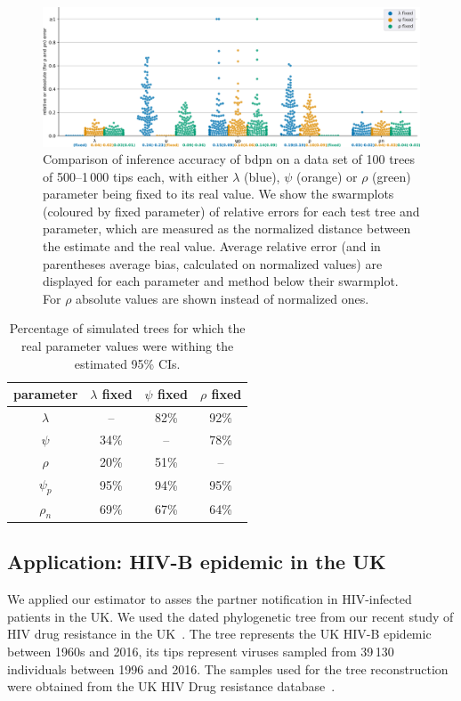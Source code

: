 \documentclass[a4paper,10pt]{article}
\begin{document}
\begin{figure}[!pht]
\centering 
\includegraphics[width=1\textwidth]{Fig_errors.eps}
\caption{Comparison of inference accuracy of bdpn on a data set of 100 trees of 500--1\,000 tips each, with either $\lambda$ (blue), $\psi$ (orange) or $\rho$ (green) parameter being fixed to its real value.
We show the swarmplots (coloured by fixed parameter) of relative errors for each test tree and parameter, which are measured as the normalized distance between the estimate and the real value. Average relative error (and in parentheses average bias, calculated on normalized values) are displayed for each parameter and method below their swarmplot. For $\rho$ absolute values are shown instead of normalized ones. } 
\label{fig:sim} 
\end{figure}
 
 \begin{table}[!h]\centering
\small
\caption{Percentage of simulated trees for which the real parameter values were withing the estimated 95\% CIs. \smallskip}
\begin{tabular}{c|ccc}
\textbf{parameter} & \textbf{$\lambda$ fixed} & \textbf{$\psi$ fixed} & \textbf{$\rho$ fixed} \\
\toprule 
 $\lambda$ & -- &  82\% & 92\% \\
 $\psi$ & 34\% & -- & 78\% \\
 $\rho$ & 20\% & 51\%  & -- \\
 $\psi_p$ & 95\% & 94\% & 95\% \\
 $\rho_n$ & 69\% & 67\% & 64\% \\
\bottomrule
\end{tabular}
\label{tbl:ci}
\end{table}


\subsection{Application: HIV-B epidemic in the UK}
We applied our estimator to asses the partner notification in HIV-infected patients in the UK. We used the dated phylogenetic tree from our recent study of HIV drug resistance in the UK~\citep{zhukovaModelingDrugResistance2023}. The tree represents the UK HIV-B epidemic between 1960s and 2016, its tips represent viruses sampled from 39\,130 individuals between 1996 and 2016. The samples used for the tree reconstruction were obtained from the UK HIV Drug resistance database~\citep{Dunn2007}.
\end{document}
